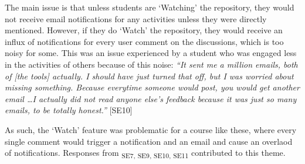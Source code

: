 The main issue is that unless students are `Watching' the repository, they would not receive email notifications for any activities unless they were directly mentioned. However, if they do `Watch' the repository, they would receive an influx of notifications for every user comment on the discussions, which is too noisy for some. This was an issue experienced by a student who was engaged less in the activities of others because of this noise: \textit{``It sent me a million emails, both of [the tools] actually. I should have just turned that off, but I was worried about missing something. Because everytime someone would post, you would get another email \ldots I actually did not read anyone else's feedback because it was just so many emails, to be totally honest.''} [SE10]

As such, the `Watch' feature was problematic for a course like these, where every single comment would trigger a notification and an email and cause an overlaod of notifications. Responses from \textsubscript{SE7, SE9, SE10, SE11} contributed to this theme.







